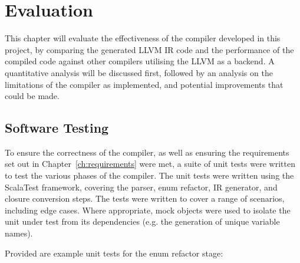 \chapter{Evaluation}

This chapter will evaluate the effectiveness of the compiler developed in this project, by comparing
the generated LLVM IR code and the performance of the compiled code against other compilers
utilising the LLVM as a backend. A quantitative analysis will be discussed first, followed by an
analysis on the limitations of the compiler as implemented, and potential improvements that could be
made.

\section{Software Testing}

To ensure the correctness of the compiler, as well as ensuring the requirements set out in
Chapter~\ref{ch:requirements} were met, a suite of unit tests were written to test the various
phases of the compiler. The unit tests were written using the ScalaTest framework, covering the
parser, enum refactor, IR generator, and closure conversion steps. The tests were written to cover a
range of scenarios, including edge cases. Where appropriate, mock objects were used to isolate the
unit under test from its dependencies (e.g. the generation of unique variable names).

Provided are example unit tests for the enum refactor stage:

